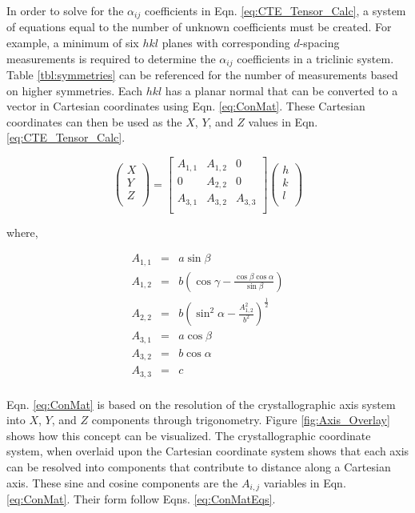 In order to solve for the $\alpha_{ij}$ coefficients in Eqn. \ref{eq:CTE_Tensor_Calc}, a system of equations equal to the number of unknown coefficients must be created.  For example, a minimum of six $hkl$ planes with corresponding $d$-spacing measurements is required to determine the $\alpha_{ij}$ coefficients in a triclinic system.  Table \ref{tbl:symmetries} can be referenced for the number of measurements based on higher symmetries.  Each $hkl$ has a planar normal that can be converted to a vector in Cartesian coordinates using Eqn. \ref{eq:ConMat}.  These Cartesian coordinates can then be used as the $X$, $Y$, and $Z$ values in Eqn. \ref{eq:CTE_Tensor_Calc}. 

\begin{equation}
 \left(
 \begin{array}{c}
 X \\
 Y \\
 Z \\
 \end{array}
 \right) =
 \left[
 \begin{array}{ccc}
  A_{1,1} & A_{1,2} & 0 \\
  0       & A_{2,2} & 0 \\
  A_{3,1} & A_{3,2} & A_{3,3}\\
 \end{array}
 \right]
 \left(
 \begin{array}{c}
  h \\
  k \\
  l \\
 \end{array}
 \right)
 \label{eq:ConMat}
\end{equation}

where,

\begin{eqnarray}
 A_{1,1} &=& a \sin \beta \nonumber \\
 A_{1,2} &=& b \left(\cos\gamma - \frac{\cos\beta\cos\alpha}{\sin\beta}\right) \nonumber \\
 A_{2,2} &=& b \left(\sin^2\alpha - \frac{A_{1,2}^2}{b^2}\right)^\frac{1}{2} \nonumber \\
 A_{3,1} &=& a \cos\beta \nonumber \\
 A_{3,2} &=& b \cos\alpha \nonumber \\
 A_{3,3} &=& c \nonumber \\
 \label{eq:ConMatEqs}
\end{eqnarray}

Eqn. \ref{eq:ConMat} is based on the resolution of the crystallographic axis system into $X$, $Y$, and $Z$ components through trigonometry.  Figure \ref{fig:Axis_Overlay} shows how this concept can be visualized.  The crystallographic coordinate system, when overlaid upon the Cartesian coordinate system shows that each axis can be resolved into components that contribute to distance along a Cartesian axis.  These sine and cosine components are the $A_{i,j}$ variables in Eqn. \ref{eq:ConMat}.  Their form follow Eqns. \ref{eq:ConMatEqs}.  

